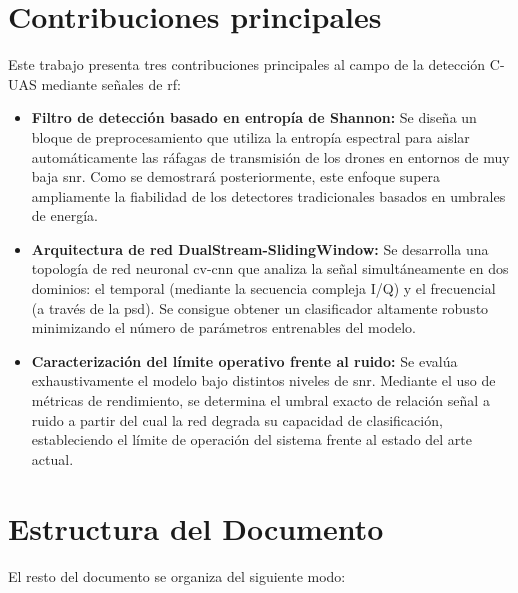 \section{Contribuciones principales}
\label{sec:contribuciones}

Este trabajo presenta tres contribuciones principales al campo de la detección C-UAS mediante señales de \gls{rf}:
\begin{itemize}
 \item \textbf{Filtro de detección basado en entropía de Shannon:} Se diseña un bloque de preprocesamiento que utiliza la entropía espectral para aislar automáticamente las ráfagas de transmisión de los drones en entornos de muy baja \gls{snr}. Como se demostrará posteriormente, este enfoque supera ampliamente la fiabilidad de los detectores tradicionales basados en umbrales de energía.

 \item \textbf{Arquitectura de red DualStream-SlidingWindow:} Se desarrolla una topología de red neuronal \gls{cv-cnn} que analiza la señal simultáneamente en dos dominios: el temporal (mediante la secuencia compleja I/Q) y el frecuencial (a través de la \gls{psd}). Se consigue obtener un clasificador altamente robusto minimizando el número de parámetros entrenables del modelo.

 \item \textbf{Caracterización del límite operativo frente al ruido:} Se evalúa exhaustivamente el modelo bajo distintos niveles de \gls{snr}. Mediante el uso de métricas de rendimiento, se determina el umbral exacto de relación señal a ruido a partir del cual la red degrada su capacidad de clasificación, estableciendo el límite de operación del sistema frente al estado del arte actual.
\end{itemize}

\section{Estructura del Documento}
\label{sec:estructura}

El resto del documento se organiza del siguiente modo:

